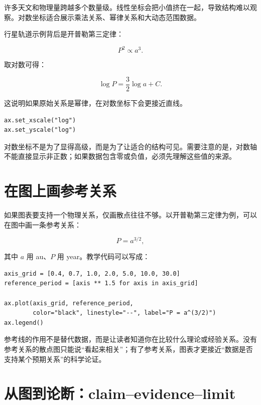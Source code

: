 许多天文和物理量跨越多个数量级。线性坐标会把小值挤在一起，导致结构难以观察。对数坐标适合展示乘法关系、幂律关系和大动态范围数据。

行星轨道示例背后是开普勒第三定律：

\[
P^2 \propto a^3.
\]

取对数可得：

\[
\log P = \frac{3}{2}\log a + C.
\]

这说明如果原始关系是幂律，在对数坐标下会更接近直线。

\begin{examplebox}[使用对数坐标]
\begin{lstlisting}[style=pythonstyle]
ax.set_xscale("log")
ax.set_yscale("log")
\end{lstlisting}
\end{examplebox}

对数坐标不是为了显得高级，而是为了让适合的结构可见。需要注意的是，对数轴不能直接显示非正数；如果数据包含零或负值，必须先理解这些值的来源。

\section{在图上画参考关系}

如果图表要支持一个物理关系，仅画散点往往不够。以开普勒第三定律为例，可以在图中画一条参考关系：

\[
P = a^{3/2},
\]

其中 \(a\) 用 au、\(P\) 用 year。教学代码可以写成：

\begin{examplebox}[参考关系线]
\begin{lstlisting}[style=pythonstyle]
axis_grid = [0.4, 0.7, 1.0, 2.0, 5.0, 10.0, 30.0]
reference_period = [axis ** 1.5 for axis in axis_grid]

ax.plot(axis_grid, reference_period,
        color="black", linestyle="--", label="P = a^(3/2)")
ax.legend()
\end{lstlisting}
\end{examplebox}

参考线的作用不是替代数据，而是让读者知道你在比较什么理论或经验关系。没有参考关系的散点图只能说“看起来相关”；有了参考关系，图表才更接近“数据是否支持某个预期关系”的科学论证。

\section{从图到论断：claim--evidence--limit}


